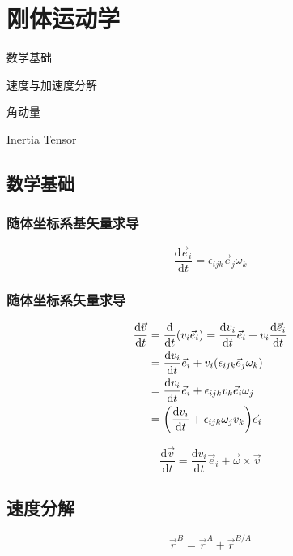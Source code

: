 \chapter{刚体运动学}
\begin{introduction}
\item 数学基础
\item 速度与加速度分解
\item 角动量
\item Inertia Tensor
\end{introduction}

\section{数学基础}
\subsection{随体坐标系基矢量求导}
\begin{equation}
  \frac{\mathrm{d}\vec{e}_i}{\mathrm{d}t}=\epsilon_{ijk}\vec{e}_j\omega_k
\end{equation}
\subsection{随体坐标系矢量求导}
\begin{equation}
  \begin{split}
    \frac{\mathrm{d}\vec{v}}{\mathrm{d}t}&=\frac{\mathrm{d}}{\mathrm{d}t}(v_i\vec{e}_i)=\frac{\mathrm{d}v_i}{\mathrm{d}t}\vec{e}_i+v_i\frac{\mathrm{d}\vec{e}_i}{\mathrm{d}t}\\
    &=\frac{\mathrm{d}v_i}{\mathrm{d}t}\vec{e}_i+v_i(\epsilon_{ijk}\vec{e}_j\omega_k)\\
    &=\frac{\mathrm{d}v_i}{\mathrm{d}t}\vec{e}_i+\epsilon_{ijk}v_k\vec{e}_i\omega_j\\
    &=\qty(\frac{\mathrm{d}v_i}{\mathrm{d}t}+\epsilon_{ijk}\omega_jv_k)\vec{e}_i
  \end{split}
\end{equation}

\begin{equation}
  \frac{\mathrm{d}\vec{v}}{\mathrm{d}t}=\frac{\mathrm{d}v_i}{\mathrm{d}t}\vec{e}_i+\vec{\omega}\times\vec{v}
\end{equation}

\section{速度分解}
\begin{equation}
  \vec{r}^B=\vec{r}^A+\vec{r}^{B/A}
\end{equation}

